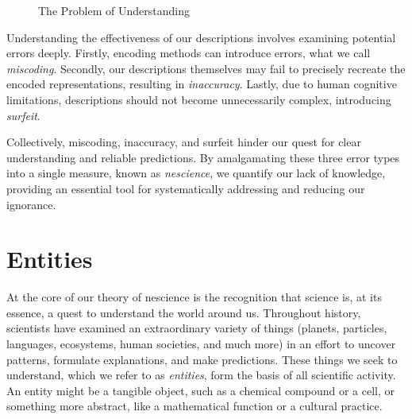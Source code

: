 \begin{figure}[t]
\centering
{}
\caption{\label{fig:representationProblem}The Problem of Understanding}
\end{figure}

Understanding the effectiveness of our descriptions involves examining potential errors deeply. Firstly, encoding methods can introduce errors, what we call \emph{miscoding}. Secondly, our descriptions themselves may fail to precisely recreate the encoded representations, resulting in \emph{inaccuracy}. Lastly, due to human cognitive limitations, descriptions should not become unnecessarily complex, introducing \emph{surfeit}.

Collectively, miscoding, inaccuracy, and surfeit hinder our quest for clear understanding and reliable predictions. By amalgamating these three error types into a single measure, known as \emph{nescience}, we quantify our lack of knowledge, providing an essential tool for systematically addressing and reducing our ignorance.

%
%

\section{Entities}

At the core of our theory of nescience is the recognition that science is, at its essence, a quest to understand the world around us. Throughout history, scientists have examined an extraordinary variety of things (planets, particles, languages, ecosystems, human societies, and much more) in an effort to uncover patterns, formulate explanations, and make predictions. These things we seek to understand, which we refer to as \emph{entities}, form the basis of all scientific activity. An entity might be a tangible object, such as a chemical compound or a cell, or something more abstract, like a mathematical function or a cultural practice.

